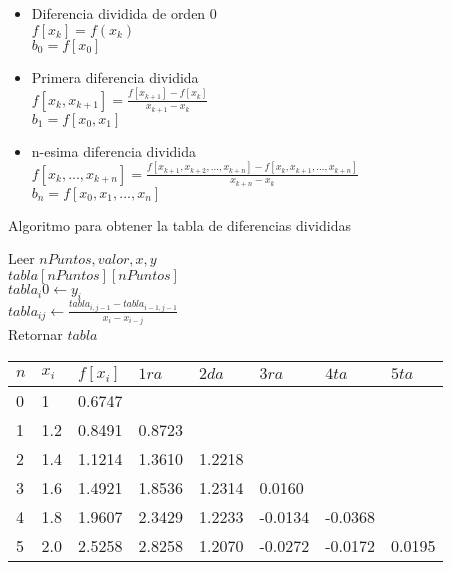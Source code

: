 \documentclass[12pt]{article}
\begin{document}
        \begin{itemize}
            \item Diferencia dividida de orden 0 \\
                $f[x_k] = f(x_k)$\\
                $b_0 = f[x_0]$\\
            \item Primera diferencia dividida\\
                $f[x_k, x_{k+1}] = \frac{f[x_{k+1}] - f[x_k]}{x_{k+1} - x_k}$\\
                $b_1 = f[x_0, x_1]$\\
            \item n-esima diferencia dividida \\ 
                $f[x_k, ..., x_{k + n}] = \frac{f[x_{k+1}, x_{k+2}, ..., x_{k+n}] - f[x_k, x_{k+1}, ..., x_{k+n}]}{x_{k+n} - x_k}$\\
                $b_n = f[x_0, x_1, ..., x_n]$\\
        \end{itemize}
        
        \begin{algorithm}[H]
            \caption{Algoritmo para obtener la tabla de diferencias divididas}
            Leer $nPuntos, valor, x, y$\\
            $tabla [nPuntos][nPuntos]$\\
            {
                $tabla_i0 \leftarrow y_i$\\
                {
                    $tabla_{ij} \leftarrow \frac{tabla_{i,j-1} - tabla_{i-1, j-1}}{x_i - x_{i-j}}$\\
                }
            }
            Retornar $tabla$\\
        \end{algorithm}

        \begin{center}
            \begin{tabular}{|l|l|l|l|l|l|l|l} \hline
            $n$ & $x_i$ & $f[x_i]$ & $1ra$ & $2da$ & $3ra$ & $4ta$ & $5ta$\\
            \hline \hline
            0 & 1 &  0.6747 & & & & & \\
            \hline 
            1 & 1.2 &  0.8491 & 0.8723 & & & & \\
            \hline
            2 & 1.4 &  1.1214 & 1.3610 & 1.2218 & & &\\
            \hline 
            3 & 1.6 &  1.4921 & 1.8536 & 1.2314 & 0.0160 & &\\
            \hline
            4 & 1.8 &  1.9607 & 2.3429 & 1.2233 & -0.0134 & -0.0368 &\\
            \hline
            5 & 2.0 &  2.5258 & 2.8258 & 1.2070 & -0.0272 & -0.0172 & 0.0195\\
            \hline 
            \end{tabular}
        \end{center}
\end{document}
